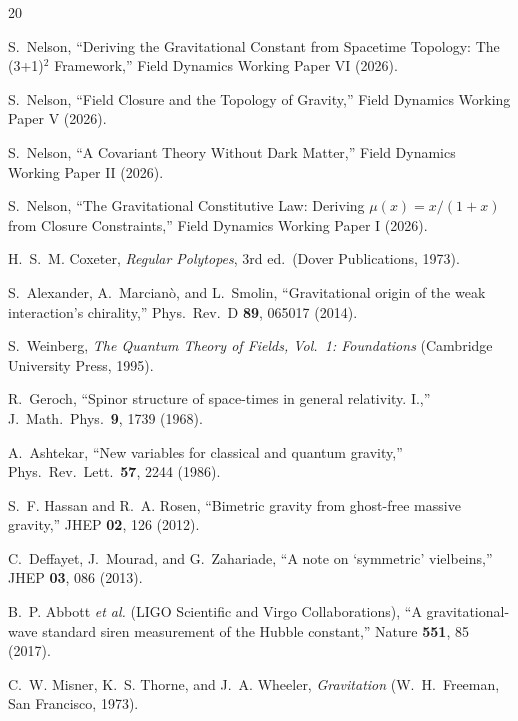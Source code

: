 \documentclass[aps,prd,preprint,superscriptaddress,showpacs,preprintnumbers,amsmath,amssymb,nofootinbib]{revtex4-2}
\begin{document}
\begin{thebibliography}{20}

S.~Nelson, ``Deriving the Gravitational Constant from Spacetime Topology: The (3+1)$^2$ Framework,'' Field Dynamics Working Paper VI (2026).

S.~Nelson, ``Field Closure and the Topology of Gravity,'' Field Dynamics Working Paper V (2026).

S.~Nelson, ``A Covariant Theory Without Dark Matter,'' Field Dynamics Working Paper II (2026).

S.~Nelson, ``The Gravitational Constitutive Law: Deriving $\mu(x) = x/(1+x)$ from Closure Constraints,'' Field Dynamics Working Paper I (2026).

H.~S.~M. Coxeter, \emph{Regular Polytopes}, 3rd ed.\ (Dover Publications, 1973).

S.~Alexander, A.~Marcian\`o, and L.~Smolin, ``Gravitational origin of the weak interaction's chirality,'' Phys.\ Rev.\ D \textbf{89}, 065017 (2014).

S.~Weinberg, \emph{The Quantum Theory of Fields, Vol.\ 1: Foundations} (Cambridge University Press, 1995).

R.~Geroch, ``Spinor structure of space-times in general relativity. I.,'' J.\ Math.\ Phys.\ \textbf{9}, 1739 (1968).

A.~Ashtekar, ``New variables for classical and quantum gravity,'' Phys.\ Rev.\ Lett.\ \textbf{57}, 2244 (1986).

S.~F. Hassan and R.~A. Rosen, ``Bimetric gravity from ghost-free massive gravity,'' JHEP \textbf{02}, 126 (2012).

C.~Deffayet, J.~Mourad, and G.~Zahariade, ``A note on `symmetric' vielbeins,'' JHEP \textbf{03}, 086 (2013).

B.~P. Abbott \textit{et al.} (LIGO Scientific and Virgo Collaborations), ``A gravitational-wave standard siren measurement of the Hubble constant,'' Nature \textbf{551}, 85 (2017).

C.~W. Misner, K.~S. Thorne, and J.~A. Wheeler, \emph{Gravitation} (W.~H.~Freeman, San Francisco, 1973).


\end{thebibliography}
\end{document}
